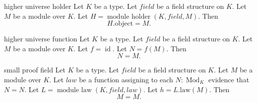 \begin{cleanresult}{higher universe holder}
Let $K$ be a type.
Let $\mathit{field}$ be a field structure on $K$.
Let $M$ be a module over $K$.
Let $H = \operatorname{module\ holder}(K, \mathit{field}, M)$.
Then \[H.\mathrm{object} = M.\]
\end{cleanresult}

\begin{cleanresult}{higher universe function}
Let $K$ be a type.
Let $\mathit{field}$ be a field structure on $K$.
Let $M$ be a module over $K$.
Let $f = \operatorname{id}$.
Let $N = f(M)$.
Then \[N = M.\]
\end{cleanresult}

\begin{cleanresult}{small proof field}
Let $K$ be a type.
Let $\mathit{field}$ be a field structure on $K$.
Let $M$ be a module over $K$.
Let $\mathit{law}$ be a function assigning to each $N : \operatorname{Mod}_{K}$ evidence that $N = N$.
Let $L = \operatorname{module\ law}(K, \mathit{field}, \mathit{law})$.
Let $h = L.\mathrm{law}(M)$.
Then \[M = M.\]
\end{cleanresult}

